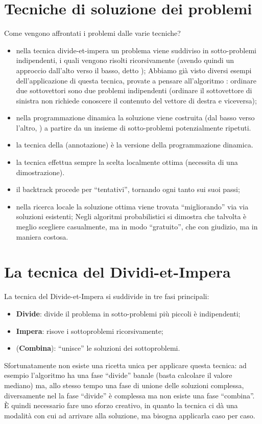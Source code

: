 \section*{Tecniche di soluzione dei problemi}

Come vengono affrontati i problemi dalle varie tecniche?
\begin{itemize}
	\item nella tecnica divide-et-impera un problema viene suddiviso in sotto-problemi indipendenti, i quali vengono risolti ricorsivamente (avendo quindi un approccio dall'alto verso il basso, detto ); Abbiamo già visto diversi esempi dell'applicazione di questa tecnica, provate a pensare all'algoritmo \mergeSort: ordinare due sottovettori sono due problemi indipendenti (ordinare il sottovettore di sinistra non richiede conoscere il contenuto del vettore di destra e viceversa);
	\item nella programmazione dinamica la soluzione viene costruita (dal basso verso l'altro, ) a partire da un insieme di sotto-problemi potenzialmente ripetuti.
	\item la tecnica della  (annotazione) è la versione  della programmazione dinamica.
	\item la tecnica  effettua sempre la scelta localmente ottima (necessita di una dimostrazione).
	\item il backtrack procede per \enquote{tentativi}, tornando ogni tanto sui suoi passi;
	\item nella ricerca locale la soluzione ottima viene trovata \enquote{migliorando} via via soluzioni esistenti; Negli algoritmi probabilistici si dimostra che talvolta è meglio scegliere casualmente, ma in modo \enquote{gratuito}, che con giudizio, ma in maniera costosa.
\end{itemize}

\section{La tecnica del Dividi-et-Impera}

La tecnica del Divide-et-Impera si suddivide in tre fasi principali:
\begin{itemize}
	\item \textbf{Divide}: divide il problema in sotto-problemi più piccoli è indipendenti;
	\item \textbf{Impera}: risove i sottoproblemi ricorsivamente;
	\item (\textbf{Combina}): \enquote{unisce} le soluzioni dei sottoproblemi.
\end{itemize}
Sfortunatamente non esiste una ricetta unica per applicare questa tecnica: ad esempio l'algoritmo \mergeSort ha una fase \enquote{divide} banale (basta calcolare il valore mediano) ma, allo stesso tempo una fase di unione delle soluzioni complessa, diversamente nel \quickSort la fase \enquote{divide} è complessa ma non esiste una fase \enquote{combina}.
\`{E} quindi necessario fare uno sforzo creativo, in quanto la tecnica ci dà una modalità con cui ad arrivare alla soluzione, ma bisogna applicarla caso per caso.


